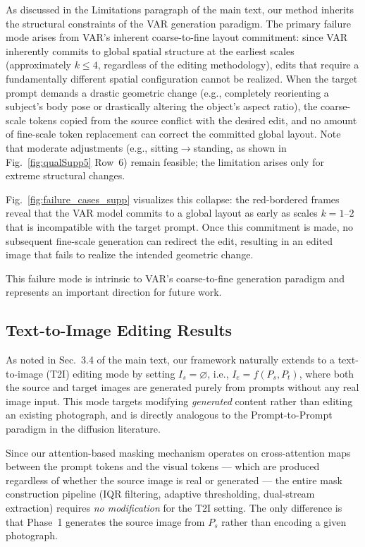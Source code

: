 As discussed in the Limitations paragraph of the main text, our method inherits the structural constraints of the VAR generation paradigm. The primary failure mode arises from VAR's inherent coarse-to-fine layout commitment: since VAR inherently commits to global spatial structure at the earliest scales (approximately $k \leq 4$, regardless of the editing methodology), edits that require a fundamentally different spatial configuration cannot be realized. When the target prompt demands a drastic geometric change (e.g., completely reorienting a subject's body pose or drastically altering the object's aspect ratio), the coarse-scale tokens copied from the source conflict with the desired edit, and no amount of fine-scale token replacement can correct the committed global layout. Note that moderate adjustments (e.g., sitting$\to$standing, as shown in Fig.~\ref{fig:qualSupp5} Row~6) remain feasible; the limitation arises only for extreme structural changes.

Fig.~\ref{fig:failure_cases_supp} visualizes this collapse: the red-bordered frames reveal that the VAR model commits to a global layout as early as scales $k{=}1$--$2$ that is incompatible with the target prompt. Once this commitment is made, no subsequent fine-scale generation can redirect the edit, resulting in an edited image that fails to realize the intended geometric change.



This failure mode is intrinsic to VAR's coarse-to-fine generation paradigm and represents an important direction for future work.

\subsection{Text-to-Image Editing Results}
\label{sec:supp_t2i_editing}

As noted in Sec.~3.4 of the main text, our framework naturally extends to a text-to-image (T2I) editing mode by setting $I_s = \varnothing$, i.e., $I_e = f(P_s, P_t)$, where both the source and target images are generated purely from prompts without any real image input. This mode targets modifying \emph{generated} content rather than editing an existing photograph, and is directly analogous to the Prompt-to-Prompt paradigm in the diffusion literature.

Since our attention-based masking mechanism operates on cross-attention maps between the prompt tokens and the visual tokens — which are produced regardless of whether the source image is real or generated — the entire mask construction pipeline (IQR filtering, adaptive thresholding, dual-stream extraction) requires \emph{no modification} for the T2I setting. The only difference is that Phase~1 generates the source image from $P_s$ rather than encoding a given photograph.

